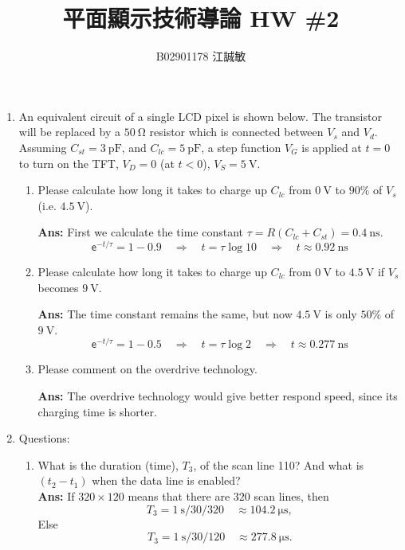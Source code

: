 \documentclass[12pt, a4paper]{article}
\title{平面顯示技術導論 HW \#2}
\author{B02901178 江誠敏}
\newcommand{\ex}{\mathsf{e}}
\begin{document}
\maketitle

\begin{enumerate}[label={\arabic*.}, leftmargin=0pt]
  \item {An equivalent circuit of a single LCD pixel is shown below.
      The transistor will be replaced by a $\SI{50}\ohm$ resistor 
      which is connected between $V_s$ and $V_d$.  
      Assuming $C_{st}= \SI{3}{\pico\farad}$, and $C_{lc}=\SI{5}{\pico\farad}$,
      a step function $V_G$ is applied at $t=0$ to turn on the TFT, $V_D=0$ (at 
      $t<0$), $V_S=\SI{5}\V$. }

    \begin{enumerate}[label={(\alph*)}]
      \item Please calculate how long it takes to charge up $C_{lc}$ from $\SI{0}\V$ to $90\%$ of $V_s$
        (i.e. $\SI{4.5}\V$).

        {\bf Ans: } First we calculate the time constant $\tau = R (C_{lc} + C_{st}) = \SI{0.4}\ns$.
        \[ \ex^{-t/\tau} = 1 - 0.9 \quad \Rightarrow \quad t = \tau \log 10 \quad 
          \Rightarrow \quad t \approx \SI{0.92}\ns \]

      \item Please calculate how long it takes to charge up $C_{lc}$ from $\SI{0}\V$ 
        to $\SI{4.5}\V$ if $V_s$ becomes $\SI{9}\V$.

        {\bf Ans: } The time constant remains the same, but now $\SI{4.5}\V$ is only
        $50\%$ of $\SI{9}\V$.
        \[ \ex^{-t/\tau} = 1-0.5 \quad \Rightarrow \quad t = \tau \log 2 \quad 
          \Rightarrow \quad t \approx \SI{0.277}\ns \]

      \item Please comment on the overdrive technology.

        {\bf Ans: } The overdrive technology would give better respond speed, since
        its charging time is shorter.
    \end{enumerate}
  \item Questions:
    \begin{enumerate}[label={(\alph*)}]
      \item What is the duration (time), $T_3$, of the scan line 110?
        And what is $(t_2 - t_1)$ when the data line is enabled? \\
        {\bf Ans: }
        If $320 \times 120$ means that there are $320$ scan lines, then
        \[ T_3 = \SI{1}\s / 30 / 320  \quad \approx \SI{104.2}\us, \]
        Else
        \[ T_3 = \SI{1}\s / 30 / 120  \quad \approx \SI{277.8}\us. \]


\end{enumerate}
\end{enumerate}
\end{document}
